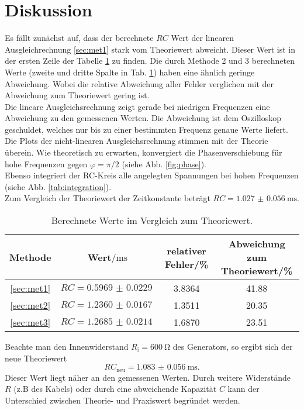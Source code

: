 \section{Diskussion}
\label{sec:Diskussion}

Es fällt zunächst auf, dass der berechnete $RC$ Wert der linearen Ausgleichrechnung \ref{sec:met1} stark vom Theoriewert abweicht.
Dieser Wert ist in der ersten Zeile der Tabelle \ref{tab:fehler} zu finden.
Die durch Methode 2 und 3 berechneten Werte (zweite und dritte Spalte in Tab. \ref{tab:fehler}) haben eine ähnlich geringe Abweichung.
Wobei die relative Abweichung aller Fehler verglichen mit der Abweichung zum Theoriewert gering ist.\\
Die lineare Ausgleichsrechnung zeigt gerade bei niedrigen Frequenzen eine Abweichung zu den gemessenen Werten.
Die Abweichung ist dem Oszilloskop geschuldet, welches nur bis zu einer bestimmten Frequenz genaue Werte liefert.\\
Die Plots der nicht-linearen Ausgleichsrechnung stimmen mit der Theorie überein.
Wie theoretisch zu erwarten, konvergiert die Phasenverschiebung für hohe Frequenzen gegen $\varphi = \pi / 2$ (siehe Abb. \ref{fig:phase}).\\
Ebenso integriert der RC-Kreis alle angelegten Spannungen bei hohen Frequenzen (siehe Abb. \ref{tab:integration}).
\\
Zum Vergleich der Theoriewert der Zeitkonstante beträgt $ RC = \SI{1.027(56)}{\milli \second}$.
\begin{table}
\centering
\caption{Berechnete Werte im Vergleich zum Theoriewert.}
\begin{tabular}{c|ccc}
    \toprule
    Methode & Wert$/\si{\milli\second} $ & relativer Fehler/\% & Abweichung zum Theoriewert/\%\\
    \midrule
    \ref{sec:met1} & $RC = \SI{0.5969(229)}{}$ & 3.8364 & 41.88\\
    \ref{sec:met2} & $RC = \SI{1.2360(167)}{}$ & 1.3511 & 20.35\\
    \ref{sec:met3} & $RC = \SI{1.2685(214)}{}$ & 1.6870 & 23.51\\ 
    \bottomrule
\end{tabular}
\label{tab:fehler}
\end{table}
\FloatBarrier
Beachte man den Innenwiderstand $R_\text{i}=\SI{600}{\ohm}$ des Generators, so ergibt sich der neue Theoriewert
\begin{equation*}
    RC_\text{neu} = \SI{1.083(56)}{\milli\second}.
\end{equation*}
Dieser Wert liegt näher an den gemessenen Werten. Durch weitere Widerstände $R$ (z.B des Kabels) oder durch eine abweichende Kapazität $C$
kann der Unterschied zwischen Theorie- und Praxiswert begründet werden.